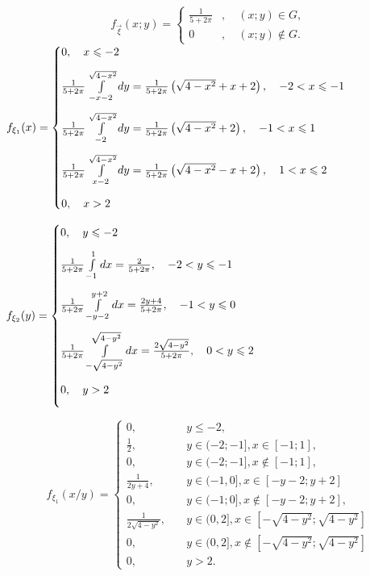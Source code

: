 \documentclass[a4paper, 20pt, titlepage]{article}
\begin{document}
\begin{spacing}{1.4}
\begin{equation*}
f_{\vec{\xi}}(x;y)=
    \begin{cases}
    \frac{1}{5+2\pi}&,\quad (x;y)\in G,\\
    0            &,\quad (x;y)\notin G.
    \end{cases}
\end{equation*}
$
f_{\xi_1} (x)= 
\begin{cases}
\vspace{3mm}
0, \quad x \leqslant -2 \\ \vspace{3mm}
\frac{1}{5+2\pi} \int \limits_{-x-2}^{\sqrt{4-x^2}} dy = \frac{1}{5+2\pi}\left(\sqrt{4-x^2} + x + 2 \right), \quad    -2 < x \leqslant -1 \\\vspace{3mm}
\frac{1}{5+2\pi}\int \limits_{-2}^{\sqrt{4-x^2}} dy = \frac{1}{5+2\pi} \left( \sqrt{4 - x^2} + 2 \right), \quad  -1 < x \leqslant 1 \\ \vspace{3mm} 
\frac{1}{5+2\pi}\int \limits_{x-2}^{\sqrt{4-x^2}} dy = \frac{1}{5+2\pi} \left(\sqrt{4-x^2} - x + 2 \right), \quad  1 < x \leqslant 2 \\
0, \quad x > 2
\end{cases}
$
\vspace{4mm}

$
f_{\xi_2} (y)= 
\begin{cases}
\vspace{3mm}
0, \quad y \leqslant -2 \\ \vspace{3mm}
\frac{1}{5+2\pi} \int \limits_{-1}^{1} dx = \frac{2}{5+2\pi}, \quad -2 < y \leqslant -1 \\ \vspace{3mm}
\frac{1}{5+2\pi} \int \limits_{-y-2}^{y+2} dx = \frac{2y+4}{5+2\pi} , \quad -1 < y \leqslant 0 \\ \vspace{3mm}
\frac{1}{5+2\pi} \int \limits_{-\sqrt{4-y^2}}^{\sqrt{4-y^2}} dx = \frac{2\sqrt{4-y^2}}{5+2\pi} ,  \quad 0 < y \leqslant 2 \\ \vspace{3mm}
0, \quad y > 2
\end{cases}
$

\begin{equation*}
f_{\xi_1}(x/y)=
    \begin{cases}
    0,\quad & y\leq -2,\\
    \frac{1}{2},\quad &y\in(-2;-1], x\in[-1;1],\\
    0,\quad &y\in(-2;-1], x\notin[-1;1],\\
    \frac{1}{2y+4},\quad &y\in(-1,0], x\in [-y-2;y+2]\\
    0,\quad &y\in(-1;0], x\notin[-y-2;y+2],\\
    \frac{1}{2\sqrt{4-y^2}},\quad &y\in(0,2], x\in [-\sqrt{4-y^2};\sqrt{4-y^2}]\\
    0,\quad &y\in(0,2], x\notin [-\sqrt{4-y^2};\sqrt{4-y^2}]\\
    0            ,\quad &y>2.
    \end{cases}
\end{equation*}


\end{spacing}
\end{document}
